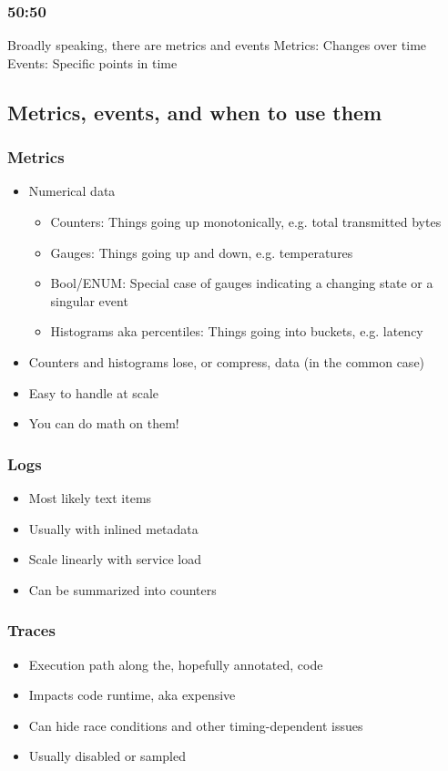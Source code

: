 \documentclass[t]{beamer}
\begin{document}
\begin{frame}
	\frametitle{50:50}
	\begin{center}
		\vfill
		Broadly speaking, there are metrics and events
		\vfill
		Metrics: Changes over time
		\vfill
		Events: Specific points in time
		\vfill
	\end{center}
\end{frame}


\subsection{Metrics, events, and when to use them}

\begin{frame}
	\frametitle{Metrics}
	\begin{itemize}
		\item Numerical data
		\begin{itemize}
			\item Counters: Things going up monotonically, e.g. total transmitted bytes
			\item Gauges: Things going up and down, e.g. temperatures
			\item Bool/ENUM: Special case of gauges indicating a changing state or a singular event
			\item Histograms aka percentiles: Things going into buckets, e.g. latency
		\end{itemize}
		\item Counters and histograms lose, or compress, data (in the common case)
		\item Easy to handle at scale
		\item You can do math on them!
	\end{itemize}
\end{frame}


\begin{frame}
	\frametitle{Logs}
	\begin{itemize}
		\item Most likely text items
		\item Usually with inlined metadata
		\item Scale linearly with service load
		\item Can be summarized into counters
	\end{itemize}
\end{frame}

\begin{frame}
	\frametitle{Traces}
	\begin{itemize}
		\item Execution path along the, hopefully annotated, code
		\item Impacts code runtime, aka expensive
		\item Can hide race conditions and other timing-dependent issues
		\item Usually disabled or sampled
	\end{itemize}
\end{frame}
\end{document}

